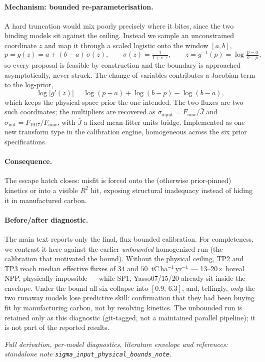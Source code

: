 \documentclass[../HIKET_draft_v1.tex]{subfiles}
\begin{document}
\paragraph{Mechanism: bounded re-parameterisation.} A hard truncation would mix
poorly precisely where it bites, since the two binding models sit against the
ceiling. Instead we sample an unconstrained coordinate $z$ and map it through a
scaled logistic onto the window $[a,b]$,
\[
  p=g(z)=a+(b-a)\,\sigma(z),\qquad \sigma(z)=\tfrac{1}{1+e^{-z}},\qquad
  z=g^{-1}(p)=\log\tfrac{p-a}{\,b-p\,},
\]
so every proposal is feasible by construction and the boundary is approached
asymptotically, never struck. The change of variables contributes a Jacobian term
to the log-prior,
\[
  \log\!\left|g'(z)\right| = \log(p-a)+\log(b-p)-\log(b-a),
\]
which keeps the physical-space prior the one intended. The two fluxes are two such
coordinates; the multipliers are recovered as
$\sigma_{\mathrm{input}}=F_{\mathrm{now}}/\bar J$ and
$\sigma_{\mathrm{init}}=F_{1917}/F_{\mathrm{now}}$, with $\bar J$ a fixed
mean-litter units bridge. Implemented as one new transform type in the calibration
engine, homogeneous across the six prior specifications.

\paragraph{Consequence.} The escape hatch closes: misfit is forced onto the
(otherwise prior-pinned) kinetics or into a visible $R^2$ hit, exposing structural
inadequacy instead of hiding it in manufactured carbon.

\paragraph{Before/after diagnostic.} The main text reports only the final,
flux-bounded calibration. For completeness, we contrast it here
against the earlier \emph{unbounded} homogenized run (the calibration that motivated
the bound). Without the physical ceiling, TP2 and TP3 reach median effective fluxes
of $34$ and $50$~tC\,ha$^{-1}$\,yr$^{-1}$ --- 13--20$\times$ boreal NPP, physically
impossible --- while SP1, Yasso07/15/20 already sit inside the envelope. Under the
bound all six collapse into $[0.9,\,6.3]$, and, tellingly, \emph{only} the two
runaway models lose predictive skill: confirmation that they had been buying fit by
manufacturing carbon, not by resolving kinetics. The unbounded run is retained only
as this diagnostic (git-tagged, not a maintained parallel pipeline); it is not part
of the reported results.

\footnotesize\emph{Full derivation, per-model diagnostics, literature envelope and
references: standalone note \texttt{sigma\_input\_physical\_bounds\_note}.}\normalsize
\end{document}
